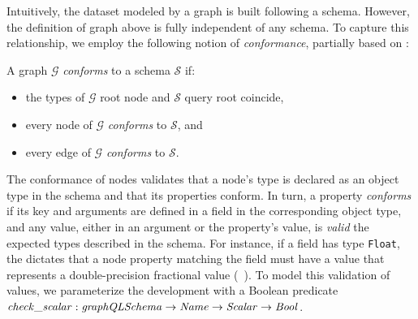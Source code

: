 Intuitively, the dataset modeled by a \gql graph is built following a
schema. However, the definition of \gql graph above is fully
independent of any schema. To capture this relationship, we employ
the following notion of \textit{conformance}, partially based
on \HP:
%
\begin{definition}\label{def:graphConform}
A \gql graph $\mathcal{G}$ \textit{conforms} to a schema $\mathcal{S}$ if: 
\begin{itemize}
    \item the types of $\mathcal{G}$ root node and $\mathcal{S}$ query
      root coincide,
    \item every node of $\mathcal{G}$ \textit{conforms} to
      $\mathcal{S}$, and
    \item every edge of $\mathcal{G}$ \textit{conforms} to
      $\mathcal{S}$. 
   
\end{itemize}
\end{definition}
%


The conformance of nodes validates that a node's type is declared as
an object type in the schema and that its properties conform. In turn,
a property \emph{conforms} if its key and arguments are defined in a
field in the corresponding object type, and any value, either in an
argument or the property's value, is \emph{valid} \wrt the expected
types described in the schema.  For instance, if a field has type
\texttt{Float}, the \spec dictates that a node property matching the
field must have a value that represents a double-precision fractional
value (\cf~\cite[\S3.5.2]{gqlspec}). %
To model this validation of values, we parameterize the \coq development
with a Boolean predicate $\mathit{check\_scalar} : \mathit{graphQLSchema}
\to \mathit{Name} \to \mathit{Scalar} \to \mathit{Bool}$.


